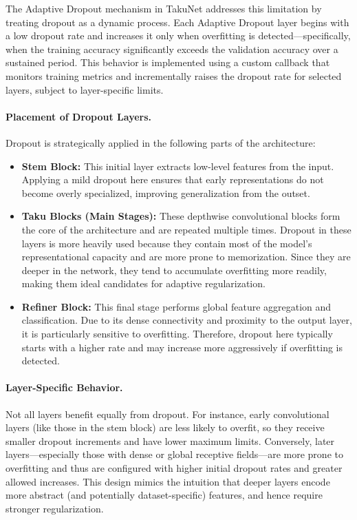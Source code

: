 The Adaptive Dropout mechanism in TakuNet addresses this limitation by treating dropout as a dynamic process. Each Adaptive Dropout layer begins with a low dropout rate and increases it only when overfitting is detected—specifically, when the training accuracy significantly exceeds the validation accuracy over a sustained period. This behavior is implemented using a custom callback that monitors training metrics and incrementally raises the dropout rate for selected layers, subject to layer-specific limits.

\paragraph{Placement of Dropout Layers.} Dropout is strategically applied in the following parts of the architecture:
\begin{itemize}
    \item \textbf{Stem Block:} This initial layer extracts low-level features from the input. Applying a mild dropout here ensures that early representations do not become overly specialized, improving generalization from the outset.
    
    \item \textbf{Taku Blocks (Main Stages):} These depthwise convolutional blocks form the core of the architecture and are repeated multiple times. Dropout in these layers is more heavily used because they contain most of the model’s representational capacity and are more prone to memorization. Since they are deeper in the network, they tend to accumulate overfitting more readily, making them ideal candidates for adaptive regularization.
    
    \item \textbf{Refiner Block:} This final stage performs global feature aggregation and classification. Due to its dense connectivity and proximity to the output layer, it is particularly sensitive to overfitting. Therefore, dropout here typically starts with a higher rate and may increase more aggressively if overfitting is detected.
\end{itemize}

\paragraph{Layer-Specific Behavior.} Not all layers benefit equally from dropout. For instance, early convolutional layers (like those in the stem block) are less likely to overfit, so they receive smaller dropout increments and have lower maximum limits. Conversely, later layers—especially those with dense or global receptive fields—are more prone to overfitting and thus are configured with higher initial dropout rates and greater allowed increases. This design mimics the intuition that deeper layers encode more abstract (and potentially dataset-specific) features, and hence require stronger regularization.

